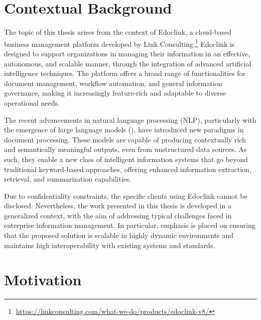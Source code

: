 \cleardoublepage
\label{chap:intro}
\section{Contextual Background}
The topic of this thesis arises from the context of Edoclink, a cloud-based business management platform developed by Link Consulting.\footnote{\url{https://linkconsulting.com/what-we-do/products/edoclink-v8/}} Edoclink is designed to support organizations in managing their information in an effective, autonomous, and scalable manner, through the integration of advanced artificial intelligence techniques. The platform offers a broad range of functionalities for document management, workflow automation, and general information governance, making it increasingly feature-rich and adaptable to diverse operational needs.

The recent advancements in natural language processing (\gls{NLP}), particularly with the emergence of large language models (), have introduced new paradigms in document processing. These models are capable of producing contextually rich and semantically meaningful outputs, even from unstructured data sources. As such, they enable a new class of intelligent information systems that go beyond traditional keyword-based approaches, offering enhanced information extraction, retrieval, and summarization capabilities.

Due to confidentiality constraints, the specific clients using Edoclink cannot be disclosed. Nevertheless, the work presented in this thesis is developed in a generalized context, with the aim of addressing typical challenges faced in enterprise information management. In particular, emphasis is placed on ensuring that the proposed solution is scalable in highly dynamic environments and maintains high interoperability with existing systems and standards.

\section{Motivation}

